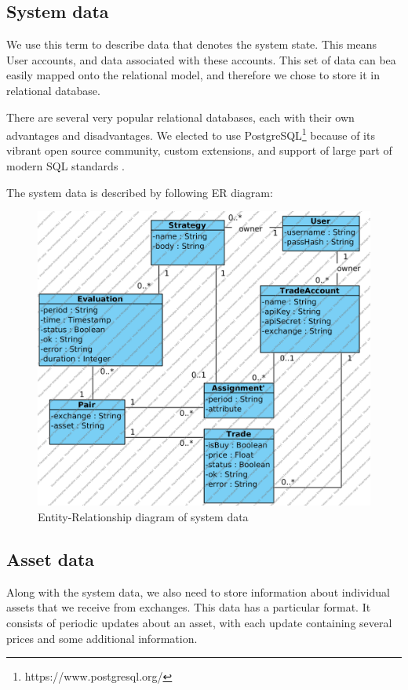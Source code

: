 \subsection{System data}
We use this term to describe data that denotes the system state. This means User accounts, and data associated with
these accounts. This set of data can bea easily mapped onto the relational model, and therefore we chose to store it
in relational database.

There are several very popular relational databases, each with their own advantages and disadvantages. We elected to
use PostgreSQL\footnote{https://www.postgresql.org/} because of its vibrant open source community, custom extensions, and support of large
part of modern SQL standards \cite{sql_comp}.

The system data is described by following ER diagram:
\begin{figure}[H]
    \includegraphics[width=\textwidth]{obrazky-figures/ERD.png}
    \caption{Entity-Relationship diagram of system data}
    \label{img:arch}
\end{figure}

\subsection{Asset data}
\label{section:ohlc}
Along with the system data, we also need to store information about individual assets that we receive from exchanges.
This data has a particular format. It consists of periodic updates about an asset, with each update containing several
prices and some additional information.


